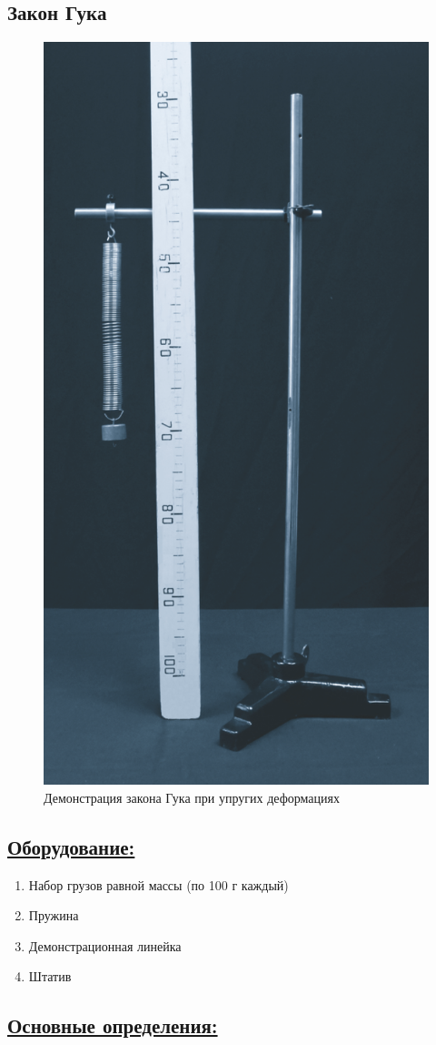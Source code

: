 \documentclass[14pt,a4paper,oneside]{extarticle}	%
\begin{document}

\begin{center}
	\subsection*{Закон Гука}
\end{center}

\begin{figure}[H] 
	\centering 
	\includegraphics[width=0.4\linewidth]{Hooke-1.png}
	\caption{Демонстрация закона Гука при упругих деформациях}
	\label{Hooke-1}
\end{figure}

\subsection*{\underline{Оборудование:}}

\begin{enumerate}
	\item Набор грузов равной массы (по 100 г каждый)
	\item Пружина
	\item Демонстрационная линейка
	\item Штатив
\end{enumerate}

\newpage
\subsection*{\underline{Основные определения:}}
\end{document}
